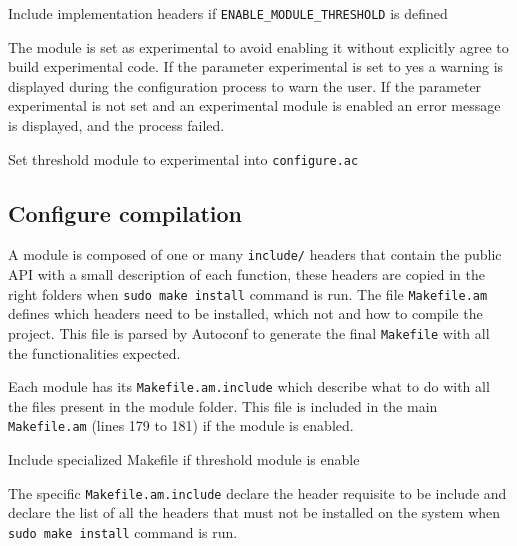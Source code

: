 \begin{listing}
	\caption{Include implementation headers if \texttt{ENABLE\_MODULE\_THRESHOLD} is
  defined}
	\label{lst:includeThresholdImplementationHeaders}
\end{listing}

The module is set as experimental to avoid enabling it without explicitly agree
to build experimental code. If the parameter experimental is set to yes a
warning is displayed during the configuration process to warn the user. If the
parameter experimental is not set and an experimental module is enabled an error
message is displayed, and the process failed.

\begin{listing}
	\caption{Set threshold module to experimental into \texttt{configure.ac}}
	\label{lst:setModuleExperimental}
\end{listing}

\subsection{Configure compilation}

A module is composed of one or many \texttt{include/} headers that contain the
public API with a small description of each function, these headers are copied
in the right folders when \texttt{sudo make install} command is run. The file
\texttt{Makefile.am} defines which headers need to be installed, which not and
how to compile the project. This file is parsed by Autoconf to generate the
final \texttt{Makefile} with all the functionalities expected.

Each module has its \texttt{Makefile.am.include} which describe what to do with
all the files present in the module folder. This file is included in the main
\texttt{Makefile.am} (lines 179 to 181) if the module is enabled.

\begin{listing}
	\caption{Include specialized Makefile if threshold module is enable}
	\label{lst:includeSpecializedMakefile}
\end{listing}

The specific \texttt{Makefile.am.include} declare the header requisite to be
include and declare the list of all the headers that must not be installed on
the system when \texttt{sudo make install} command is run.

